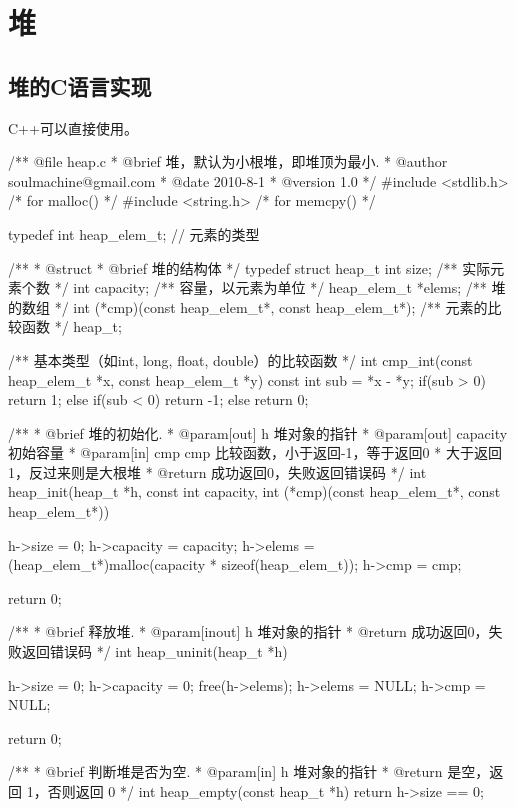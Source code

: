 \section{堆} %

\subsection{堆的C语言实现}
C++可以直接使用。

\begin{Codex}[label=heap.c]
/** @file heap.c
 * @brief 堆，默认为小根堆，即堆顶为最小.
 * @author soulmachine@gmail.com
 * @date 2010-8-1
 * @version 1.0
 */
#include <stdlib.h>  /* for malloc() */
#include <string.h>  /* for memcpy() */

typedef int heap_elem_t; // 元素的类型

/**
 * @struct
 * @brief 堆的结构体
 */
typedef struct heap_t {
    int     size;   /** 实际元素个数 */
    int     capacity; /** 容量，以元素为单位 */
    heap_elem_t  *elems;   /** 堆的数组 */
    int (*cmp)(const heap_elem_t*, const heap_elem_t*);   /** 元素的比较函数 */
}heap_t;


/** 基本类型（如int, long, float, double）的比较函数 */
int cmp_int(const heap_elem_t *x, const heap_elem_t *y) {
    const int sub = *x - *y;
    if(sub > 0) {
        return 1;
    } else if(sub < 0) {
        return -1;
    } else {
        return 0;
    }
}

/** 
 * @brief 堆的初始化.
 * @param[out] h 堆对象的指针
 * @param[out] capacity 初始容量
 * @param[in] cmp cmp 比较函数，小于返回-1，等于返回0
 * 大于返回1，反过来则是大根堆
 * @return 成功返回0，失败返回错误码
 */
int heap_init(heap_t *h, const int capacity, 
              int (*cmp)(const heap_elem_t*, const heap_elem_t*)) {
    h->size = 0;
    h->capacity = capacity;
    h->elems = (heap_elem_t*)malloc(capacity * sizeof(heap_elem_t));
    h->cmp = cmp;
    
    return 0;
}

/** 
 * @brief 释放堆.
 * @param[inout] h 堆对象的指针
 * @return 成功返回0，失败返回错误码
 */
int heap_uninit(heap_t *h) {
    h->size = 0;
    h->capacity = 0;
    free(h->elems);
    h->elems = NULL;
    h->cmp = NULL;

    return 0;
}


/** 
 * @brief 判断堆是否为空.
 * @param[in] h 堆对象的指针
 * @return 是空，返回 1，否则返回 0
 */
int heap_empty(const heap_t *h) {
    return h->size == 0;
}


\end{Codex}
